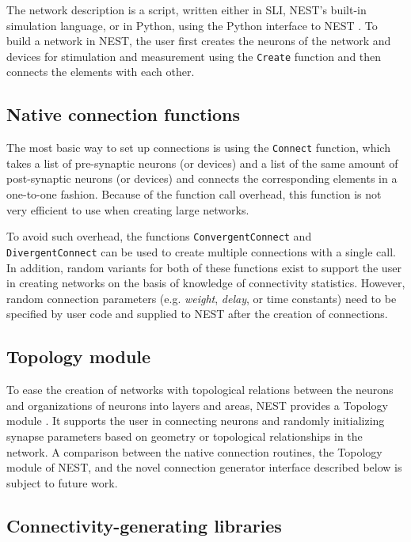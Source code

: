 \documentclass{frontiersSCNS} %
\begin{document}
The network description is a script, written either in SLI, NEST's
built-in simulation language, or in Python, using the Python interface
to NEST \citep[PyNEST;][]{Eppler09_12}. To build a network in NEST,
the user first creates the neurons of the network and devices for
stimulation and measurement using the \verb|Create| function and then
connects the elements with each other.

\subsection{Native connection functions}

The most basic way to set up connections is using the \verb|Connect|
function, which takes a list of pre-synaptic neurons (or devices) and
a list of the same amount of post-synaptic neurons (or devices) and
connects the corresponding elements in a one-to-one fashion. Because
of the function call overhead, this function is not very efficient to
use when creating large networks.

To avoid such overhead, the functions \verb|ConvergentConnect| and
\verb|DivergentConnect| can be used to create multiple connections
with a single call. In addition, random variants for both of these
functions exist to support the user in creating networks on the basis
of knowledge of connectivity statistics. However, random connection
parameters (e.g. \emph{weight}, \emph{delay}, or time constants) need
to be specified by user code and supplied to NEST after the creation
of connections.

\subsection{Topology module}

To ease the creation of networks with topological relations between
the neurons and organizations of neurons into layers and areas, NEST
provides a Topology module \citep{Plesser_13}. It supports the user in
connecting neurons and randomly initializing synapse parameters based
on geometry or topological relationships in the network. A comparison
between the native connection routines, the Topology module of NEST,
and the novel connection generator interface described below is
subject to future work.

\subsection{Connectivity-generating libraries}
\end{document}
